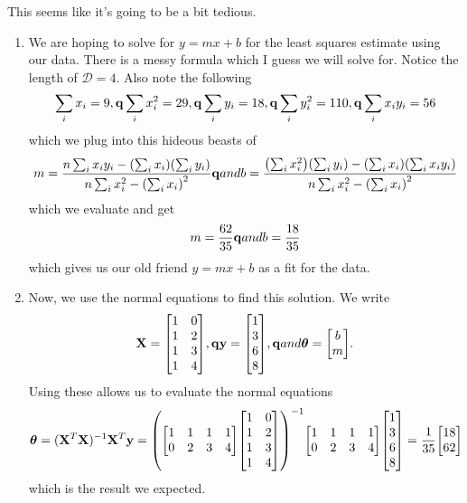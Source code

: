 \documentclass[12pt,letterpaper]{hmcpset}
\begin{document}
\begin{solution}
    This seems like it's going to be a bit tedious.
    \begin{enumerate}
        \item We are hoping to solve for $y = m x + b$ for the least squares estimate using our data. There is a messy formula which I guess we will solve for. Notice the length of $\mathcal D = 4$. Also note the following 
        \begin{align*}
            \sum_i x_i = 9, {\bf q}{} \sum_i x_i^2 = 29, {\bf q}{} \sum_i y_i = 18, {\bf q}{} \sum_i y_i^2 = 110,  {\bf q}{} \sum_i x_iy_i = 56
        \end{align*}
        which we plug into this hideous beasts of 
        \begin{align*}
            m = \frac{n \sum_i x_iy_i - \qty(\sum_i x_i) \qty(\sum_i y_i) }{n \sum_i x_i^2 - \qty(\sum_i x_i)^2}
            {\bf q}{and}
            b = \frac{\qty(\sum_i x_i^2)\qty(\sum_i y_i) - \qty(\sum_i x_i)\qty(\sum_i x_iy_i)}{n \sum_i x_i^2 - \qty(\sum_i x_i)^2}
        \end{align*}
        which we evaluate and get
        \begin{align*}
            m = \frac{62}{35}
            {\bf q}{and}
            b = \frac{18}{35}
        \end{align*}
        which gives us our old friend $y = mx + b$ as a fit for the data.

        \item Now, we use the normal equations to find this solution. We write 
        \begin{align*}
            \vb X = \mqty[1 & 0 \\ 
                         1 & 2 \\
                         1 & 3 \\
                         1 & 4   
                            ], \qq{} \vb y = \mqty[ 1\\ 3\\6\\8], \qq{and} \thetab = \mqty[b \\m].
        \end{align*}
        Using these allows us to evaluate the normal equations
        \begin{align*}
            \thetab &= (\vb X^T \vb X)^{-1}\vb X^T \vb y  = \qty( \mqty[1 & 1 & 1 & 1 \\
 0 & 2 & 3 & 4   
                            ] \mqty[1 & 0 \\ 
                         1 & 2 \\
                         1 & 3 \\
                         1 & 4   
                            ] )^{-1} \mqty[1 & 1 & 1 & 1 \\
 0 & 2 & 3 & 4]
                         \mqty[ 1\\ 3\\6\\8] = \frac{1}{35} \mqty[18 \\ 62 ]
        \end{align*}
        which is the result we expected. 


\end{enumerate}
\end{solution}
\end{document}
